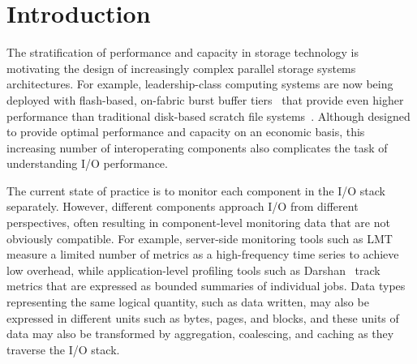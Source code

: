 \section{Introduction} \label{sec:introduction}



The stratification of performance and capacity in storage technology is motivating the design of increasingly complex parallel storage systems architectures.
For example, leadership-class computing systems are now being deployed with flash-based, on-fabric burst buffer tiers~\cite{Henseler2016} that provide even higher performance than traditional disk-based scratch file systems~\cite{Bhimji2016}.
Although designed to provide optimal performance and capacity on an economic basis, this increasing number of interoperating components also complicates the task of understanding I/O performance.


The current state of practice is to monitor each component in the I/O stack separately.
However, different components approach I/O from different perspectives, often resulting in component-level monitoring data that are not obviously compatible.
For example, server-side monitoring tools such as LMT~\cite{lmt} measure a limited number of metrics as a high-frequency time series to achieve low overhead, while application-level profiling tools such as Darshan~\cite{carns200924} track metrics that are expressed as bounded
summaries of individual jobs.
Data types representing the same logical quantity, such as data written, may also be expressed in different units such as bytes, pages, and blocks, and these units of data may also be transformed by aggregation, coalescing, and caching as they traverse the I/O stack.


